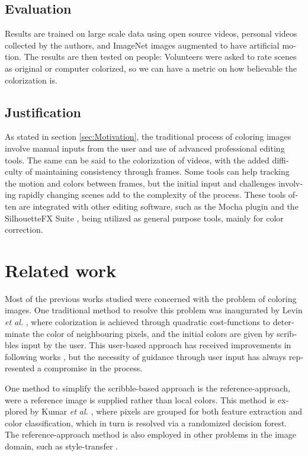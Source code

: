 \documentclass[12pt,openright,oneside,a4paper,english]{abntex2}
\begin{document}
\begin{otherlanguage}{english}
\section{Evaluation}
Results are trained on large scale data using open source videos, personal videos collected by the authors, and ImageNet images augmented to have artificial motion. %
The results are then tested on people: Volunteers were asked to rate scenes as original or computer colorized, so we can have a metric on how believable the colorization is.

\section{Justification}
As stated in section \ref{sec:Motivation}, the traditional process of coloring images involve manual inputs from the user and use of advanced professional editing tools.
The same can be said to the colorization of videos, with the added difficulty of maintaining consistency through frames. Some tools can help tracking the motion and colors between frames, but the initial input and challenges involving rapidly changing scenes add to the complexity of the process. These tools often are integrated with other editing software, such as the Mocha plugin \cite{mocha} and the SilhouetteFX Suite \cite{silhoutte}, being utilized as general purpose tools, mainly for color correction.

\chapter{Related work}
Most of the previous works studied were concerned with the problem of coloring images. One traditional method to resolve this problem was inaugurated by Levin  \textit{et al.} \cite{Levin2004},
where colorization is achieved through quadratic cost-functions to determinate the color of neighbouring pixels, and the initial colors are given by scribbles input by the user. This user-based approach has received improvements in following works \cite{Huang2005} \cite{Kumar2012},
but the necessity of guidance through user input has always represented a compromise in the process.

One method to simplify the scribble-based approach is the reference-approach, were a reference image is supplied rather than local colors. This method is explored by Kumar \textit{et al.} \cite{Kumar2012},
where pixels are grouped for both feature extraction and color classification, which in turn is resolved via a randomized decision forest. The reference-approach method is also employed in other problems in the image domain, such as style-transfer \cite{Ruder2016}.


\end{otherlanguage}
\end{document}
